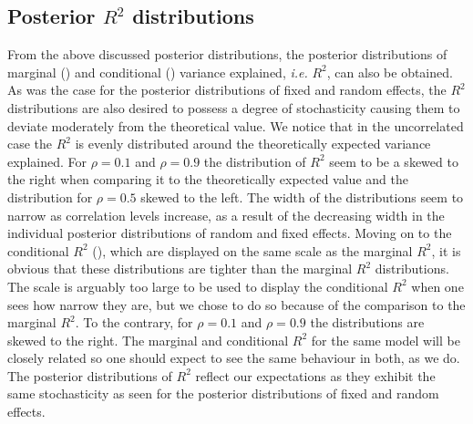 \subsection{Posterior $R^2$ distributions}
From the above discussed posterior distributions, the posterior distributions of marginal () and conditional () variance explained, \textit{i.e.} $R^2$, can also be obtained.
As was the case for the posterior distributions of fixed and random effects, the $R^2$ distributions are also desired to possess a degree of stochasticity causing them to deviate moderately from the theoretical value.
We notice that in the uncorrelated case the $R^2$ is evenly distributed around the theoretically expected variance explained. 
For $\rho=0.1$ and $\rho=0.9$ the distribution of $R^2$ seem to be a skewed to the right when comparing it to the theoretically expected value and the distribution for $\rho=0.5$ skewed to the left.
The width of the distributions seem to narrow as correlation levels increase, as a result of the decreasing width in the individual posterior distributions of random and fixed effects.
\newline
\newline
Moving on to the conditional $R^2$ (), which are displayed on the same scale as the marginal $R^2$, it is obvious that these distributions are tighter than the marginal $R^2$ distributions.
The scale is arguably too large to be used to display the conditional $R^2$ when one sees how narrow they are, but we chose to do so because of the comparison to the marginal $R^2$.
To the contrary, for $\rho=0.1$ and $\rho=0.9$ the distributions are skewed to the right. 
The marginal and conditional $R^2$ for the same model will be closely related so one should expect to see the same behaviour in both, as we do.
\newline
\newline
The posterior distributions of $R^2$ reflect our expectations as they exhibit the same stochasticity as seen for the posterior distributions of fixed and random effects.
